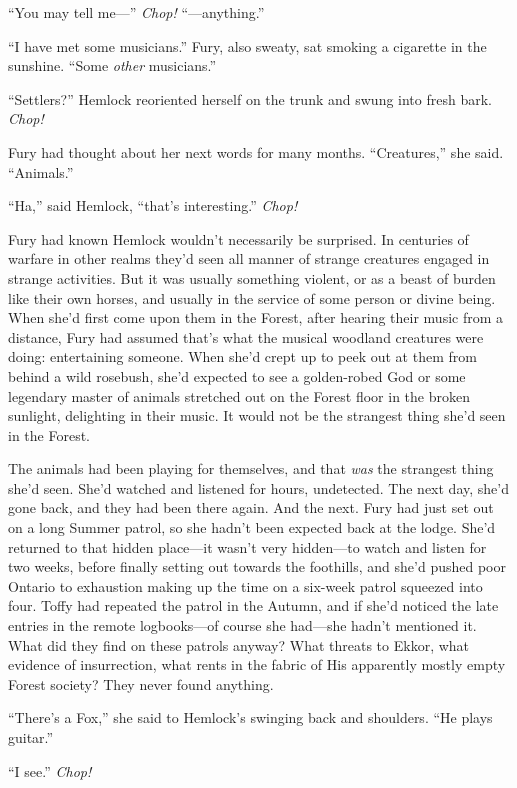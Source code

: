 \documentclass[11pt,a5paper]{article}
\begin{document}
``You may tell me---'' \emph{Chop!} ``---anything.''

``I have met some musicians.'' Fury, also sweaty, sat smoking a cigarette in the sunshine. ``Some \emph{other} musicians.''

``Settlers?'' Hemlock reoriented herself on the trunk and swung into fresh bark. \emph{Chop!}

Fury had thought about her next words for many months. ``Creatures,'' she said. ``Animals.''

``Ha,'' said Hemlock, ``that's interesting.'' \emph{Chop!}

Fury had known Hemlock wouldn't necessarily be surprised. In centuries of warfare in other realms they'd seen all manner of strange creatures engaged in strange activities. But it was usually something violent, or as a beast of burden like their own horses, and usually in the service of some person or divine being. When she'd first come upon them in the Forest, after hearing their music from a distance, Fury had assumed that's what the musical woodland creatures were doing: entertaining someone. When she'd crept up to peek out at them from behind a wild rosebush, she'd expected to see a golden-robed God or some legendary master of animals stretched out on the Forest floor in the broken sunlight, delighting in their music. It would not be the strangest thing she'd seen in the Forest.

The animals had been playing for themselves, and that \emph{was} the strangest thing she'd seen. She'd watched and listened for hours, undetected. The next day, she'd gone back, and they had been there again. And the next. Fury had just set out on a long Summer patrol, so she hadn't been expected back at the lodge. She'd returned to that hidden place---it wasn't very hidden---to watch and listen for two weeks, before finally setting out towards the foothills, and she'd pushed poor Ontario to exhaustion making up the time on a six-week patrol squeezed into four. Toffy had repeated the patrol in the Autumn, and if she'd noticed the late entries in the remote logbooks---of course she had---she hadn't mentioned it. What did they find on these patrols anyway? What threats to Ekkor, what evidence of insurrection, what rents in the fabric of His apparently mostly empty Forest society? They never found anything.

``There's a Fox,'' she said to Hemlock's swinging back and shoulders. ``He plays guitar.''

``I see.'' \emph{Chop!}
\end{document}
